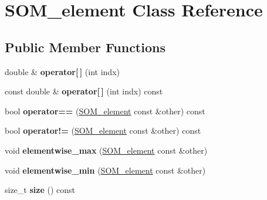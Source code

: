 \hypertarget{classSOM__element}{}\section{S\+O\+M\+\_\+element Class Reference}
\label{classSOM__element}
\subsection*{Public Member Functions}
\begin{DoxyCompactItemize}
\item 
\hypertarget{classSOM__element_abdfecd0673190e37a719f74ed0e09d2c}{}double \& {\bfseries operator\mbox{[}$\,$\mbox{]}} (int indx)\label{classSOM__element_abdfecd0673190e37a719f74ed0e09d2c}

\item 
\hypertarget{classSOM__element_a60549253b524e96ae36e8980304142a4}{}const double \& {\bfseries operator\mbox{[}$\,$\mbox{]}} (int indx) const \label{classSOM__element_a60549253b524e96ae36e8980304142a4}

\item 
\hypertarget{classSOM__element_aebb4c7d1afcfb209be553391bc82f04d}{}bool {\bfseries operator==} (\hyperlink{classSOM__element}{S\+O\+M\+\_\+element} const \&other) const \label{classSOM__element_aebb4c7d1afcfb209be553391bc82f04d}

\item 
\hypertarget{classSOM__element_a1d7cfd3c411ed6f21f9e5b14110c13d0}{}bool {\bfseries operator!=} (\hyperlink{classSOM__element}{S\+O\+M\+\_\+element} const \&other) const \label{classSOM__element_a1d7cfd3c411ed6f21f9e5b14110c13d0}

\item 
\hypertarget{classSOM__element_a8dd446460e54f2fae31852fd57fe6874}{}void {\bfseries elementwise\+\_\+max} (\hyperlink{classSOM__element}{S\+O\+M\+\_\+element} const \&other)\label{classSOM__element_a8dd446460e54f2fae31852fd57fe6874}

\item 
\hypertarget{classSOM__element_a11ef8646cfb6142bf85c5b1e86769ddf}{}void {\bfseries elementwise\+\_\+min} (\hyperlink{classSOM__element}{S\+O\+M\+\_\+element} const \&other)\label{classSOM__element_a11ef8646cfb6142bf85c5b1e86769ddf}

\item 
\hypertarget{classSOM__element_a088b0bafd6d9cc217d552d1cc82af2f8}{}size\+\_\+t {\bfseries size} () const \label{classSOM__element_a088b0bafd6d9cc217d552d1cc82af2f8}

\end{DoxyCompactItemize}
